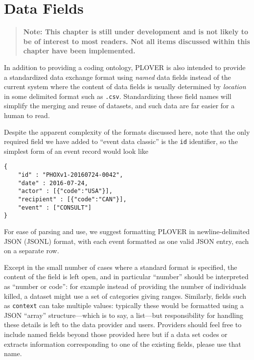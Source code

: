 \documentclass[11pt]{report}
\newcommand{\ti}[1]{\textit{#1}}
\newcommand{\txt}[1]{\texttt{#1}}
\begin{document}
\chapter{Data Fields}

\begin{quote}
\textbf{Note: This chapter is still under development and is not likely to be of interest to most readers. Not all items discussed within this chapter have been implemented.}

\end{quote}
\bigskip

In addition to providing a coding ontology, PLOVER is also intended to provide a standardized data exchange format using \ti{named} data fields instead of the current system where the content of data fields is usually determined by \ti{location} in some delimited format such as \txt{.csv}. Standardizing these field names will simplify the merging and reuse of datasets, and such data are far easier for a human to read.

Despite the apparent complexity of the formats discussed here, note that the only required field we have added to ``event data classic'' is the \texttt{id} identifier, so the simplest form of an event record would look like
\begin{verbatim}
{
	"id" : "PHOXv1-20160724-0042",
	"date" : 2016-07-24,
	"actor" : [{"code":"USA"}],
	"recipient" : [{"code":"CAN"}],
	"event" : ["CONSULT"]
}
\end{verbatim}

\noindent For ease of parsing and use, we suggest formatting PLOVER in newline-delimited JSON (JSONL) format, with each event formatted as one valid JSON entry, each on a separate row.

Except in the small number of cases where a standard format is specified, the content of the field is left open, and in particular ``number'' should be interpreted as ``number or code'': for example instead of providing the number of individuals killed, a dataset might use a set of categories giving ranges. Similarly, fields such as \texttt{context} can take multiple values: typically these would be formatted using a JSON ``array'' structure---which is to say, a list---but responsibility for handling these details is left to the data provider and users.  Providers should feel free to include named fields beyond those provided here but if a data set codes or extracts information  corresponding to one of the existing fields, please use that name.
\end{document}
